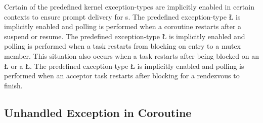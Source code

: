 \documentclass[openright,twoside]{report}
\begin{document}
Certain of the predefined kernel exception-types are implicitly enabled in certain contexts to ensure prompt delivery for s.
The predefined exception-type \LGinlinetrue\LGbegin\lgrinde\L{}\endlgrinde\LGend{} is implicitly enabled and polling is performed when a coroutine restarts after a suspend or resume.
The predefined exception-type \LGinlinetrue\LGbegin\lgrinde\L{}\endlgrinde\LGend{} is implicitly enabled and polling is performed when a task restarts from blocking on entry to a mutex member.
This situation also occurs when a task restarts after being blocked on an \LGinlinetrue\LGbegin\lgrinde\L{}\endlgrinde\LGend{} or a \LGinlinetrue\LGbegin\lgrinde\L{}\endlgrinde\LGend{}.
The predefined exception-type \LGinlinetrue\LGbegin\lgrinde\L{}\endlgrinde\LGend{} is implicitly enabled and polling is performed when an acceptor task restarts after blocking for a rendezvous to finish.


\subsection{Unhandled Exception in Coroutine}
\end{document}
